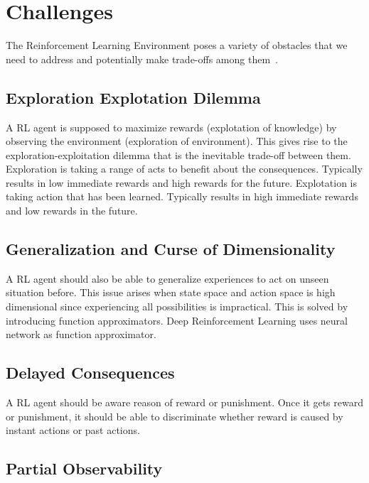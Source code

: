 \section{Challenges}
\label{sec:chal}

The Reinforcement Learning Environment poses a variety of obstacles 
that we need to address and potentially make trade-offs among them~\cite{dulac-arnold_challenges_2019, sutton_reinforcement_1998}.

\subsection{Exploration Explotation Dilemma}

A RL agent is supposed to maximize rewards (explotation of knowledge) by observing the environment (exploration of environment). 
This gives rise to the exploration-exploitation dilemma that is the inevitable trade-off between them. 
Exploration is taking a range of acts to benefit about the consequences. 
Typically results in low immediate rewards and high rewards for the future. 
Explotation is taking action that has been learned. Typically results in high immediate rewards and low rewards in the future. 

\subsection{Generalization and Curse of Dimensionality}

A RL agent should also be able to generalize experiences to act on unseen situation before. 
This issue arises when state space and action space is high dimensional since experiencing all possibilities is impractical. 
This is solved by introducing function approximators. Deep Reinforcement Learning uses neural network as function approximator. 

\subsection{Delayed Consequences}

A RL agent should be aware reason of reward or punishment. 
Once it gets reward or punishment, it should be able to discriminate whether reward is caused by instant actions or past actions. 

\subsection{Partial Observability}

